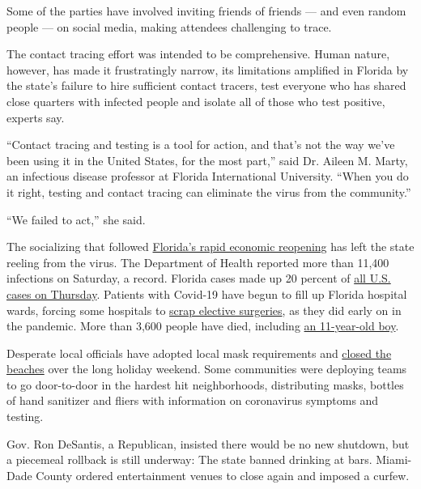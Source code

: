 Some of the parties have involved inviting friends of friends --- and
even random people --- on social media, making attendees challenging to
trace.

The contact tracing effort was intended to be comprehensive. Human
nature, however, has made it frustratingly narrow, its limitations
amplified in Florida by the state's failure to hire sufficient contact
tracers, test everyone who has shared close quarters with infected
people and isolate all of those who test positive, experts say.

``Contact tracing and testing is a tool for action, and that's not the
way we've been using it in the United States, for the most part,'' said
Dr. Aileen M. Marty, an infectious disease professor at Florida
International University. ``When you do it right, testing and contact
tracing can eliminate the virus from the community.''

``We failed to act,'' she said.

The socializing that followed
\href{https://www.nytimes3xbfgragh.onion/2020/06/26/nyregion/florida-coronavirus-ny.html}{Florida's
rapid economic reopening} has left the state reeling from the virus. The
Department of Health reported more than 11,400 infections on Saturday, a
record. Florida cases made up 20 percent of
\href{https://www.nytimes3xbfgragh.onion/2020/07/02/world/coronavirus-us.html?action=click\&module=Top\%20Stories\&pgtype=Homepage}{all
U.S. cases on Thursday}. Patients with Covid-19 have begun to fill up
Florida hospital wards, forcing some hospitals to
\href{https://www.nytimes3xbfgragh.onion/2020/07/01/world/coronavirus-updates.html}{scrap
elective surgeries}, as they did early on in the pandemic. More than
3,600 people have died, including
\href{https://www.miamiherald.com/news/coronavirus/article243959612.html}{an
11-year-old boy}.

Desperate local officials have adopted local mask requirements and
\href{https://www.nytimes3xbfgragh.onion/2020/07/02/us/coronavirus-fourth-of-july.html}{closed
the beaches} over the long holiday weekend. Some communities were
deploying teams to go door-to-door in the hardest hit neighborhoods,
distributing masks, bottles of hand sanitizer and fliers with
information on coronavirus symptoms and testing.

Gov. Ron DeSantis, a Republican, insisted there would be no new
shutdown, but a piecemeal rollback is still underway: The state banned
drinking at bars. Miami-Dade County ordered entertainment venues to
close again and imposed a curfew.

